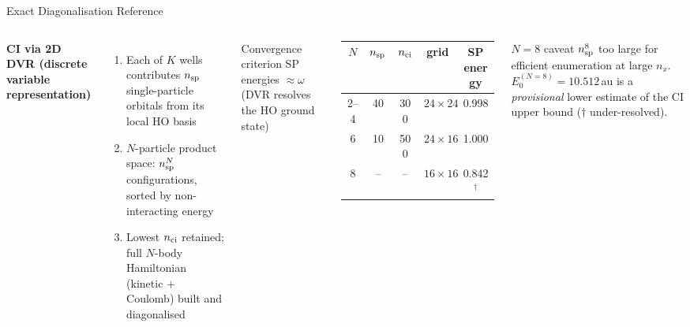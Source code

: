 \documentclass[aspectratio=169,10pt]{beamer}
\begin{document}
\begin{frame}{Exact Diagonalisation Reference}
  \begin{columns}[T]
      \textbf{CI via 2D DVR (discrete variable representation)}
      \begin{enumerate}
        \item Each of $K$ wells contributes $n_{\rm sp}$ single-particle
              orbitals from its local HO basis
        \item $N$-particle product space: $n_{\rm sp}^N$ configurations,
              sorted by non-interacting energy
        \item Lowest $n_{\rm ci}$ retained; full $N$-body Hamiltonian
              (kinetic $+$ Coulomb) built and diagonalised
      \end{enumerate}
      \vspace{0.3cm}
      \begin{block}{Convergence criterion}
        SP energies $\approx \omega$ (DVR resolves the HO ground state)
      \end{block}
      \renewcommand{\arraystretch}{1.25}
      \scriptsize
      \begin{tabular}{c|ccc|c}
        \toprule
        $N$ & $n_{\rm sp}$ & $n_{\rm ci}$ & grid & SP energy \\
        \midrule
        2--4 & 40  & 300 & $24\!\times\!24$ & 0.998 \\
        6    & 10  & 500 & $24\!\times\!16$ & 1.000 \\
        8    & --  & --  & $16\!\times\!16$ & 0.842$^\dagger$ \\
        \bottomrule
      \end{tabular}
      \normalsize
      \vspace{0.25cm}
      \begin{alertblock}{$N=8$ caveat}
        $n_{\rm sp}^8$ too large for efficient enumeration at large $n_x$.
        $E_0^{(N=8)}=10.512$\,au is a \emph{provisional} lower estimate of
        the CI upper bound ($\dagger$ under-resolved).
      \end{alertblock}
  \end{columns}
\end{frame}
\end{document}
